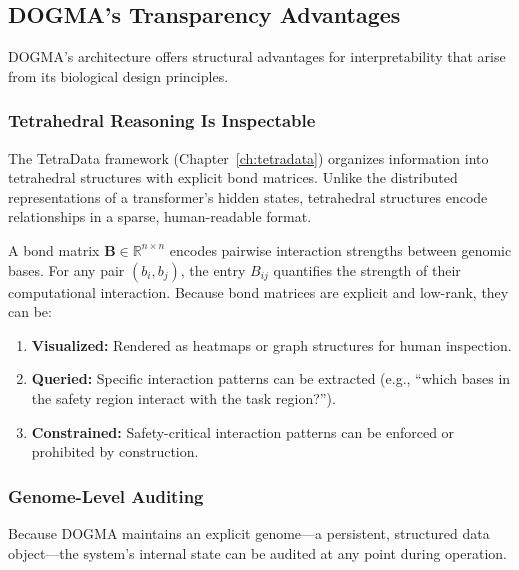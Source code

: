 \subsection{DOGMA's Transparency Advantages}

DOGMA's architecture offers structural advantages for interpretability that arise from its biological design principles.

\subsubsection{Tetrahedral Reasoning Is Inspectable}

The TetraData framework (Chapter~\ref{ch:tetradata}) organizes information into tetrahedral structures with explicit bond matrices.
Unlike the distributed representations of a transformer's hidden states, tetrahedral structures encode relationships in a sparse, human-readable format.

\begin{dogmadef}
A bond matrix $\mathbf{B} \in \mathbb{R}^{n \times n}$ encodes pairwise interaction strengths between genomic bases.
For any pair $(b_i, b_j)$, the entry $B_{ij}$ quantifies the strength of their computational interaction.
Because bond matrices are explicit and low-rank, they can be:
\begin{enumerate}[leftmargin=1.5em]
  \item \textbf{Visualized:} Rendered as heatmaps or graph structures for human inspection.
  \item \textbf{Queried:} Specific interaction patterns can be extracted (e.g., ``which bases in the safety region interact with the task region?'').
  \item \textbf{Constrained:} Safety-critical interaction patterns can be enforced or prohibited by construction.
\end{enumerate}
\end{dogmadef}

\subsubsection{Genome-Level Auditing}

Because DOGMA maintains an explicit genome---a persistent, structured data object---the system's internal state can be audited at any point during operation.

